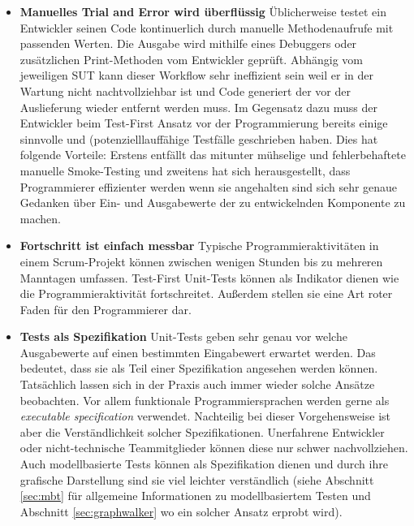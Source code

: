\begin{itemize}
\item \textbf{Manuelles Trial and Error wird überflüssig} Üblicherweise testet ein Entwickler seinen Code kontinuerlich durch manuelle Methodenaufrufe mit passenden Werten. Die Ausgabe wird mithilfe eines Debuggers oder zusätzlichen Print-Methoden vom Entwickler geprüft. Abhängig vom jeweiligen SUT kann dieser Workflow sehr ineffizient sein weil er in der Wartung nicht nachtvollziehbar ist und Code generiert der vor der Auslieferung wieder entfernt werden muss. Im Gegensatz dazu muss der Entwickler beim Test-First Ansatz vor der Programmierung bereits einige sinnvolle und (potenzielllauffähige Testfälle geschrieben haben. Dies hat folgende Vorteile: Erstens entfällt das mitunter mühselige und fehlerbehaftete manuelle Smoke-Testing und zweitens hat sich herausgestellt, dass Programmierer effizienter werden wenn sie angehalten sind sich sehr genaue Gedanken über Ein- und Ausgabewerte der zu entwickelnden Komponente zu machen\cite{erdogmus_effectiveness_2005}.
\item \textbf{Fortschritt ist einfach messbar} Typische Programmieraktivitäten in einem Scrum-Projekt können zwischen wenigen Stunden bis zu mehreren Manntagen umfassen. Test-First Unit-Tests können als Indikator dienen wie die Programmieraktivität fortschreitet. Außerdem stellen sie eine Art roter Faden für den Programmierer dar.
\item \textbf{Tests als Spezifikation} Unit-Tests geben sehr genau vor welche Ausgabewerte auf einen bestimmten Eingabewert erwartet werden. Das bedeutet, dass sie als Teil einer Spezifikation angesehen werden können. Tatsächlich lassen sich in der Praxis auch immer wieder solche Ansätze beobachten. Vor allem funktionale Programmiersprachen werden gerne als \textit{executable specification} verwendet\cite{klein_sel4:_2010}. Nachteilig bei dieser Vorgehensweise ist aber die Verständlichkeit solcher Spezifikationen. Unerfahrene Entwickler oder nicht-technische Teammitglieder können diese nur schwer nachvollziehen. Auch modellbasierte Tests können als Spezifikation dienen und durch ihre grafische Darstellung sind sie viel leichter verständlich (siehe Abschnitt \ref{sec:mbt} für allgemeine Informationen zu modellbasiertem Testen und Abschnitt \ref{sec:graphwalker} wo ein solcher Ansatz erprobt wird).
\end{itemize}


